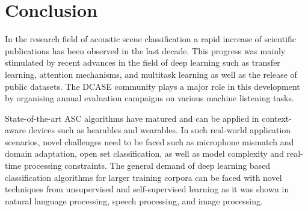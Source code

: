 \documentclass[applsci,article,submit,oneauthor,pdftex]{Definitions/mdpi}
\begin{document}



\section{Conclusion}
\label{sec:conclusion}


In the research field of acoustic scene classification a rapid increase of scientific publications has been observed in the last decade. This progress was mainly stimulated by recent advances in the field of deep learning such as transfer learning, attention mechanisms, and multitask learning as well as the release of public datasets.
The DCASE community plays a major role in this development by organising annual evaluation campaigns on various machine listening tasks.



State-of-the-art ASC algorithms have matured and can be applied in context-aware devices such as hearables and wearables.
In such real-world application scenarios, novel challenges need to be faced such as microphone mismatch and domain adaptation, open set classification, as well as model complexity and real-time processing constraints.
The general demand of deep learning based classification algorithms for larger training corpora can be faced with novel techniques from unsupervised and self-supervised learning as it was shown in natural language processing, speech processing, and image processing.
\end{document}
